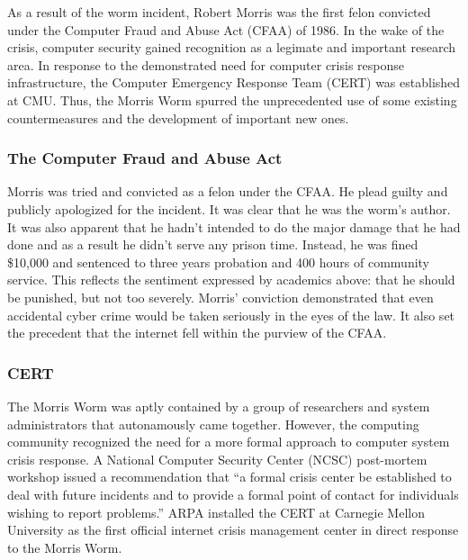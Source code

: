 As a result of the worm incident, Robert Morris was the first felon convicted
under the Computer Fraud and Abuse Act (CFAA) of 1986. In the wake of the
crisis, computer security gained recognition as a legimate and important
research area. In response to the demonstrated need for computer crisis
response infrastructure, the Computer Emergency Response Team (CERT) was
established at CMU. Thus, the Morris Worm spurred the unprecedented use of some
existing countermeasures and the development of important new ones.

\subsubsection*{The Computer Fraud and Abuse Act}
Morris was tried and convicted as a felon under the CFAA. He plead guilty and
publicly apologized for the incident. It was clear that he was the worm's
author. It was also apparent that he hadn't intended to do the major damage that
he had done and as a result he didn't serve any prison time. Instead, he was
fined \$10,000 and sentenced to three years probation and 400 hours of
community service\cite{lee_washpost_2013}. This reflects the sentiment
expressed by academics above: that he should be punished, but not too severely.
Morris' conviction demonstrated that even accidental cyber
crime would be taken seriously in the eyes of the law. It also set the
precedent that the internet fell within the purview of the
CFAA\cite{adams_controlling_1996}.

\subsubsection*{CERT}
The Morris Worm was aptly contained by a group of researchers and
system administrators that autonamously came together. However, the
computing community recognized the need for a more formal approach to computer
system crisis response. A National Computer Security Center (NCSC) post-mortem
workshop issued a recommendation that ``a formal crisis center be
established to deal with future incidents and to provide a formal point of
contact for individuals wishing to report problems.''\cite{spafford_crisis_1989}
ARPA installed the CERT at Carnegie Mellon
University as the first official internet crisis management center in direct
response to the Morris Worm\cite{fithen_cert_1994}.

